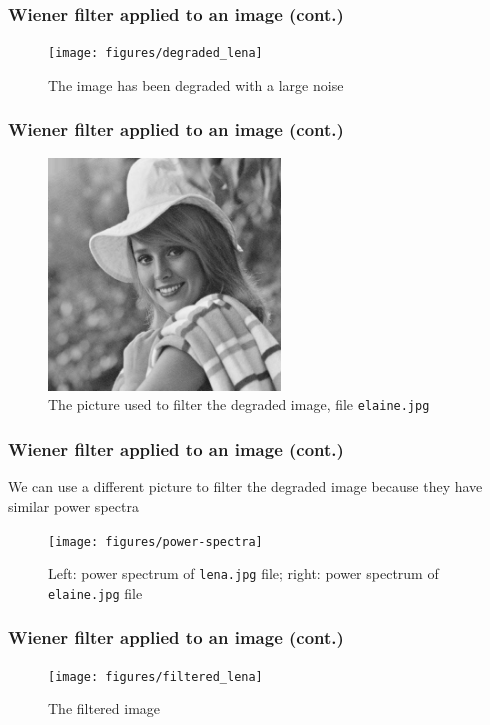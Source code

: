 \documentclass[10pt]{beamer}
\begin{document}
\begin{frame}
  \frametitle{Wiener filter applied to an image (cont.)}
  \begin{figure}
    \centering
    \texttt{[image: figures/degraded\_lena]}
    \caption{The image has been degraded with a large noise}
  \end{figure}
\end{frame}

\begin{frame}
  \frametitle{Wiener filter applied to an image (cont.)}
  \begin{figure}
    \centering
    \includegraphics[width=0.55\textwidth]{elaine}
    \caption{The picture used to filter the degraded image, file
      \texttt{elaine.jpg}}
  \end{figure}
\end{frame}

\begin{frame}
  \frametitle{Wiener filter applied to an image (cont.)}
  We can use a different picture to filter the degraded image because they have
  similar power spectra
  \begin{figure}
    \centering
    \texttt{[image: figures/power-spectra]}
    \caption{Left: power spectrum of \texttt{lena.jpg} file; right: power
      spectrum of \texttt{elaine.jpg} file}
  \end{figure}
\end{frame}

\begin{frame}
  \frametitle{Wiener filter applied to an image (cont.)}
  \begin{figure}
    \centering
    \texttt{[image: figures/filtered\_lena]}
    \caption{The filtered image}
  \end{figure}
\end{frame}
\end{document}
